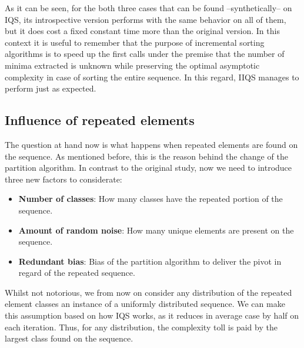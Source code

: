 As it can be seen, for the both three cases that can be found --synthetically-- on IQS, its introspective version performs with the same behavior on all of them, but it does cost a fixed constant time more than the original version. In this context it is useful to remember that the purpose of incremental sorting algorithms is to speed up the first calls under the premise that the number of minima extracted is unknown while preserving the optimal asymptotic complexity in case of sorting the entire sequence. In this regard, IIQS manages to perform just as expected.\\

\subsection{Influence of repeated elements}

The question at hand now is what happens when repeated elements are found on the sequence. As mentioned before, this is the reason behind the change of the partition algorithm. In contrast to the original study, now we need to introduce three new factors to considerate:

\begin{itemize}
    \item \textbf{Number of classes}: How many classes have the repeated portion of the sequence.
    \item \textbf{Amount of random noise}: How many unique elements are present on the sequence.
    \item \textbf{Redundant bias}: Bias of the partition algorithm to deliver the pivot in regard of the repeated sequence.
\end{itemize}

Whilst not notorious, we from now on consider any distribution of the repeated element classes an instance of a uniformly distributed sequence. We can make this assumption based on how IQS works, as it reduces in average case by half on each iteration. Thus, for any distribution, the complexity toll is paid by the largest class found on the sequence.\\


